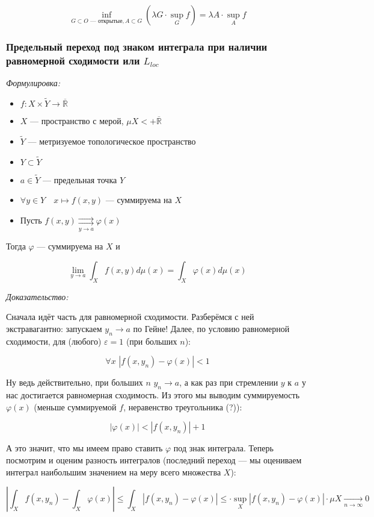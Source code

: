 \documentclass{article}
\def\dbl{\,\,}
\def\rsh#1{\underset{#1}{\rightrightarrows}}
\def\rinf{\overline{\mathbb{R}}}
\def\goesto#1{\underset{#1}{\longrightarrow}}
\def\toinf#1{\goesto{#1 \rightarrow \infty}}
\def\ntoinf{\toinf{n}}
\begin{document}
\[\inf_{G \subset O\text{ --- открытые}, A \subset G} \left(\lambda G \cdot \sup_{G}f\right) = \lambda A \cdot \sup_{A} f  \]

\subsubsection{Предельный переход под знаком интеграла при наличии равномерной сходимости или $L_{loc}$}
\textit{Формулировка:}

\begin{itemize}
    \item $f: X \times \tilde{Y} \rightarrow \rinf$
    \item $X$ --- пространство с мерой, $\mu X < + \rinf$
    \item $\tilde{Y}$ --- метризуемое топологическое пространство
    \item $Y \subset \tilde{Y}$
    \item $a \in \tilde{Y}$ --- предельная точка  $Y$
    \item $\forall y \in Y \quad x \mapsto f(x, y)$ --- суммируема на $X$
    \item Пусть $f(x, y) \rsh{y \rightarrow a} \varphi(x)$
\end{itemize}

Тогда $\varphi$ --- суммируема на $X$ и 

\[\lim_{y \rightarrow a} \int_{X} f(x, y) d \mu(x) = \int_{X} \varphi(x) d \mu(x)\]
 
\textit{Доказательство:}

Сначала идёт часть для равномерной сходимости. Разберёмся с ней экстравагантно: запускаем $y_n \rightarrow a$ по Гейне! Далее, по условию равномерной сходимости, для (любого) $\varepsilon = 1$ (при больших $n$):

\[\forall x \dbl |f(x, y_n) - \varphi(x)| < 1\]

Ну ведь действительно, при больших $n \dbl y_n \rightarrow a$, а как раз при стремлении $y$ к $a$ у нас достигается равномерная сходимость. Из этого мы выводим суммируемость $\varphi(x)$ (меньше суммируемой $f$, неравенство треугольника (?)):

\[|\varphi(x)| < |f(x, y_n)| + 1\]

А это значит, что мы имеем право ставить $\varphi$ под знак интеграла. Теперь посмотрим и оценим разность интегралов (последний переход --- мы оцениваем интеграл наибольшим значением на меру всего множества $X$):

\[\left| \int_{X} f(x, y_n) - \int_{X} \varphi(x)\right| \le \int_{X} |f(x, y_n) - \varphi(x)| \le \cdot \sup_{X} |f(x, y_n) - \varphi(x)| \cdot \mu X \ntoinf 0\]
\end{document}
